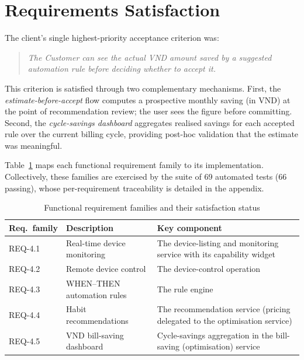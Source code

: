 \section{Requirements Satisfaction}

The client's single highest-priority acceptance criterion was:

\begin{quote}
\textit{The Customer can see the actual VND amount saved by a suggested
automation rule before deciding whether to accept it.}
\end{quote}

This criterion is satisfied through two complementary mechanisms.  First, the
\emph{estimate-before-accept} flow computes a prospective monthly saving (in
VND) at the point of recommendation review; the user sees the figure before
committing.  Second, the \emph{cycle-savings dashboard} aggregates realised
savings for each accepted rule over the current billing cycle, providing
post-hoc validation that the estimate was meaningful.

Table~\ref{tab:req-satisfaction} maps each functional requirement family to its
implementation.  Collectively, these families are exercised by the suite of
69 automated tests (66 passing), whose per-requirement traceability is detailed in the
appendix.

\begin{table}[htbp]
  \centering
  \caption{Functional requirement families and their satisfaction status}
  \label{tab:req-satisfaction}
  \begin{tabularx}{\textwidth}{@{} l X X @{}}
    \toprule
    \textbf{Req.\ family} & \textbf{Description} & \textbf{Key component} \\
    \midrule
    REQ-4.1 & Real-time device monitoring & The device-listing and monitoring service with its capability widget \\
    REQ-4.2 & Remote device control & The device-control operation \\
    REQ-4.3 & WHEN--THEN automation rules & The rule engine \\
    REQ-4.4 & Habit recommendations & The recommendation service (pricing delegated to the optimisation service) \\
    REQ-4.5 & VND bill-saving dashboard & Cycle-savings aggregation in the bill-saving (optimisation) service \\
    \bottomrule
  \end{tabularx}
\end{table}

